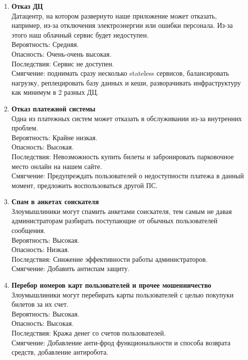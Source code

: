 \begin{enumerate}
      \item \textbf{Отказ ДЦ} \\
            Датацентр, на котором развернуто наше приложение может отказать, например,
            из-за отключения электроэнергии или ошибки персонала. Из-за этого наш облачный
            сервис будет недоступен. \\
            Вероятность: Средняя. \\
            Опасность: Очень-очень высокая. \\
            Последствия: Сервис не доступен. \\
            Смягчение: поднимать сразу несколько stateless сервисов,
            балансировать нагрузку, реплецировать базу данных и кеши,
            разворачивать инфраструктуру как минимум в 2 разных ДЦ.

      \item \textbf{Отказ платежной системы} \\
            Одна из платежных систем может отказать в обслуживании из-за 
            внутренних проблем. \\
            Вероятность: Крайне низкая. \\
            Опасность: Высокая. \\
            Последствия: Невозможность купить билеты и забронировать 
            парковочное место онлайн на нашем сайте. \\
            Смягчение: Предупреждать пользователей о недоступности платежа в 
            данный момент, предложить воспользоваться другой ПС.
      
      \item \textbf{Спам в анкетах соискателя} \\
            Злоумышлиники могут спамить анкетами соискателя, тем самым
            не давая администраторам разбирать поступающие от обычных 
            пользователей сообщения. \\
            Вероятность: Высокая. \\
            Опасность: Низкая. \\
            Последствия: Снижение эффективности работы администраторов. \\
            Смягчение: Добавить антиспам защиту.

      \item \textbf{Перебор номеров карт пользователей и прочее мошенничество} \\
            Злоумышлиники могут перебирать карты пользователей с целью покупуки
            билетов за их счет. \\
            Вероятность: Высокая. \\
            Опасность: Высокая. \\
            Последствия: Кража денег со счетов пользователей. \\
            Смягчение: Добавление анти-фрод функциональности и способа возврата средств,
            добавление антиробота. 
      

\end{enumerate}
